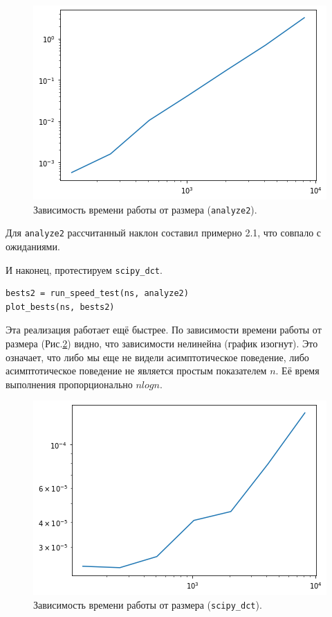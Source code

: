 \documentclass[a4paper, 14pt]{extarticle}
\begin{document}
    \begin{figure}[h]
        \centering
        \includegraphics[width=0.8\linewidth]{resources/Images/task1_test_analyze2}
        \caption{Зависимость времени работы от размера (\texttt{analyze2}).}
        \label{fig:task1_test_analyze2}
    \end{figure}

    Для \texttt{analyze2} рассчитанный наклон составил примерно 2.1, что совпало с ожиданиями.

    И наконец, протестируем \texttt{scipy\_dct}.

    \begin{lstlisting}[caption= Функция \texttt{scipy\_dct}., label={lst:task1_test_scipy_dct}]
bests2 = run_speed_test(ns, analyze2)
plot_bests(ns, bests2)  \end{lstlisting}

    Эта реализация работает ещё быстрее. По зависимости времени работы от размера (Рис.\ref{fig:task1_test_scipy_dct}) видно,
    что зависимости нелинейна (график изогнут). Это означает, что либо мы еще не видели асимптотическое поведение,
    либо асимптотическое поведение не является простым показателем $n$. Её время выполнения пропорционально
    $n log n$.

    \begin{figure}[H]
        \centering
        \includegraphics[width=0.7\linewidth]{resources/Images/task1_test_scipy_dct}
        \caption{Зависимость времени работы от размера (\texttt{scipy\_dct}).}
        \label{fig:task1_test_scipy_dct}
    \end{figure}
\end{document}
